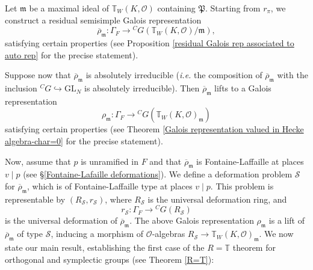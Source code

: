 \documentclass[12pt,oneside,reqno]{amsart}
\theoremstyle{plain}
\begin{document}
	Let $\mathfrak{m}$ be a maximal ideal of $\mathbb{T}_W(K, \mathcal{O})$ containing $\mathfrak{P}$. Starting from $r_{\pi}$, we construct a residual semisimple Galois representation  
	\[
	\overline{\rho}_{\mathfrak{m}}
	\colon
	\Gamma_F \to {}^C G(\mathbb{T}_W(K, \mathcal{O}) / \mathfrak{m}),
	\]
	satisfying certain properties (see Proposition \ref{residual Galois rep associated to auto rep} for the precise statement).  
	
	Suppose now that $\overline{\rho}_\mathfrak{m}$ is absolutely irreducible (\emph{i.e.} the composition of $\overline{\rho}_\mathfrak{m}$ with the inclusion ${}^C G \hookrightarrow \mathrm{GL}_N$ is absolutely irreducible). Then $\overline{\rho}_\mathfrak{m}$ lifts to a Galois representation  
	\[
	\rho_{\mathfrak{m}}
	\colon
	\Gamma_{F} \to {}^C G(\mathbb{T}_W(K, \mathcal{O})_{\mathfrak{m}})
	\]
	satisfying certain properties (see Theorem \ref{Galois representation valued in Hecke algebra-char=0} for the precise statement).  
	
	Now, assume that $p$ is unramified in $F$ and that $\overline{\rho}_\mathfrak{m}$ is Fontaine-Laffaille at places $v \mid p$ (see §\ref{Fontaine-Lafaille deformations}). We define a deformation problem $\mathcal{S}$ for $\overline{\rho}_{\mathfrak{m}}$, which is of Fontaine-Laffaille type at places $v \mid p$. This problem is representable by $(R_\mathcal{S}, r_\mathcal{S})$, where $R_\mathcal{S}$ is the universal deformation ring, and  
	\[
	r_\mathcal{S} \colon \Gamma_{F} \to {}^C G(R_\mathcal{S})
	\]  
	is the universal deformation of $\overline{\rho}_\mathfrak{m}$. The above Galois representation $\rho_{\mathfrak{m}}$ is a lift of $\overline{\rho}_\mathfrak{m}$ of type $\mathcal{S}$, inducing a morphism of $\mathcal{O}$-algebras $R_\mathcal{S} \to \mathbb{T}_W(K, \mathcal{O})_\mathfrak{m}$. We now state our main result, establishing the first case of the $R = \mathbb{T}$ theorem for orthogonal and symplectic groups (see Theorem \ref{R=T}):  
	
	
	
	
	
	
	
\end{document}
